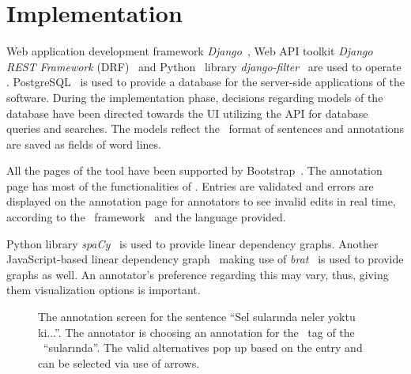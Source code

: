 \section{Implementation}
\label{sec:implementation}

Web application development framework \textit{Django}~\cite{django}, Web API toolkit \textit{Django REST Framework} (DRF)~\cite{drf} and Python~\cite{python} library \textit{django-filter}~\cite{django-filter} are used to operate \boatvtwo.
PostgreSQL~\cite{psql} is used to provide a database for the server-side applications of the software.
During the implementation phase, decisions regarding models of the database have been directed towards the UI utilizing the API for database queries and searches.
The models reflect the \ud\ format of sentences and annotations are saved as fields of word lines.

All the pages of the tool have been supported by Bootstrap~\cite{bootstrap}.
The annotation page has most of the functionalities of \boatvone.
Entries are validated and errors are displayed on the annotation page for annotators to see invalid edits in real time, according to the \ud\ framework~\cite{UD} and the language provided.

Python library \textit{spa\textsc{C}y}~\cite{spacy} is used to provide linear dependency graphs.
Another JavaScript-based linear dependency graph~\cite{spyssalo} making use of \textit{brat}~\cite{brat} is used to provide graphs as well.
An annotator's preference regarding this may vary, thus, giving them visualization options is important.

\begin{figure}[tbh]
    \centering
    \caption{The annotation screen for the sentence ``Sel sularında neler yoktu ki...''.
        The annotator is choosing an annotation for the \deprel\ tag of the \form\ ``sularında''.
        The valid alternatives pop up based on the entry and can be selected via use of arrows. }
    \label{fig:anno-fig}
\end{figure}

